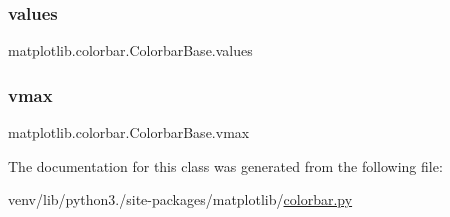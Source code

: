 \subsubsection{\texorpdfstring{values}{values}}
{\footnotesize\ttfamily matplotlib.\+colorbar.\+Colorbar\+Base.\+values}

\mbox{\label{classmatplotlib_1_1colorbar_1_1ColorbarBase_ae1dd3b927ec5bf9ebcce1e2301684643}} 
\subsubsection{\texorpdfstring{vmax}{vmax}}
{\footnotesize\ttfamily matplotlib.\+colorbar.\+Colorbar\+Base.\+vmax}



The documentation for this class was generated from the following file\+:\begin{DoxyCompactItemize}
\item 
venv/lib/python3./site-\/packages/matplotlib/\hyperlink{colorbar_8py}{colorbar.\+py}\end{DoxyCompactItemize}
